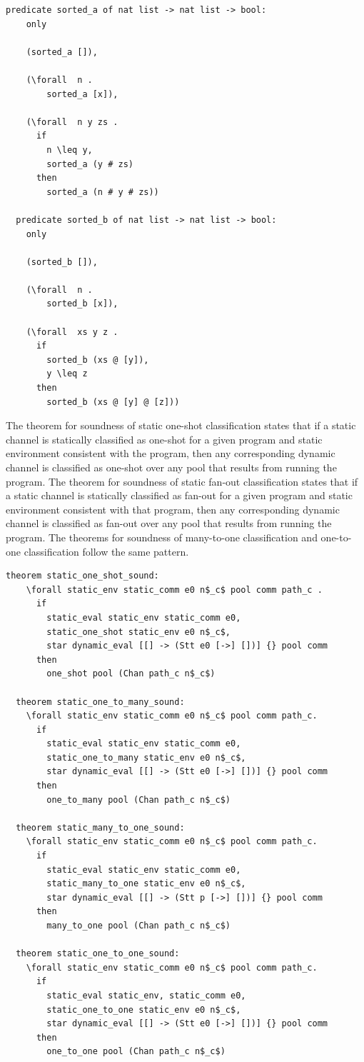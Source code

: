 \documentclass[10pt]{article}
\begin{document}
\begin{lstlisting}[language=logic, mathescape]
  predicate sorted_a of nat list -> nat list -> bool:
    only

    (sorted_a []),

    (\forall  n .
        sorted_a [x]),

    (\forall  n y zs .
      if 
        n \leq y,
        sorted_a (y # zs)
      then
        sorted_a (n # y # zs))

  predicate sorted_b of nat list -> nat list -> bool:
    only

    (sorted_b []),

    (\forall  n .
        sorted_b [x]),

    (\forall  xs y z .
      if 
        sorted_b (xs @ [y]),
        y \leq z 
      then
        sorted_b (xs @ [y] @ [z]))
  \end{lstlisting}

The theorem for soundness of static one-shot classification states that if a static channel is
statically classified as one-shot for a given program and
static environment consistent with the
program, then any corresponding dynamic channel is classified
as one-shot over any pool that results
from running the program. The theorem for soundness of
static fan-out classification states that if
a static channel is statically classified as fan-out for a given program and static environment
consistent with that program, then any corresponding dynamic channel is classified as fan-out
over any pool that results from running the program.  The theorems for soundness of many-to-one
classification and one-to-one classification follow the same pattern. 

\begin{lstlisting}[language=logic, mathescape]
  theorem static_one_shot_sound: 
    \forall static_env static_comm e0 n$_c$ pool comm path_c .
      if
        static_eval static_env static_comm e0, 
        static_one_shot static_env e0 n$_c$, 
        star dynamic_eval [[] -> (Stt e0 [->] [])] {} pool comm
      then
        one_shot pool (Chan path_c n$_c$)

  theorem static_one_to_many_sound:
    \forall static_env static_comm e0 n$_c$ pool comm path_c. 
      if 
        static_eval static_env static_comm e0, 
        static_one_to_many static_env e0 n$_c$, 
        star dynamic_eval [[] -> (Stt e0 [->] [])] {} pool comm
      then
        one_to_many pool (Chan path_c n$_c$)

  theorem static_many_to_one_sound:
    \forall static_env static_comm e0 n$_c$ pool comm path_c. 
      if
        static_eval static_env static_comm e0, 
        static_many_to_one static_env e0 n$_c$, 
        star dynamic_eval [[] -> (Stt p [->] [])] {} pool comm
      then
        many_to_one pool (Chan path_c n$_c$)

  theorem static_one_to_one_sound:
    \forall static_env static_comm e0 n$_c$ pool comm path_c. 
      if
        static_eval static_env, static_comm e0, 
        static_one_to_one static_env e0 n$_c$,
        star dynamic_eval [[] -> (Stt e0 [->] [])] {} pool comm
      then
        one_to_one pool (Chan path_c n$_c$)
\end{lstlisting}
\end{document}
